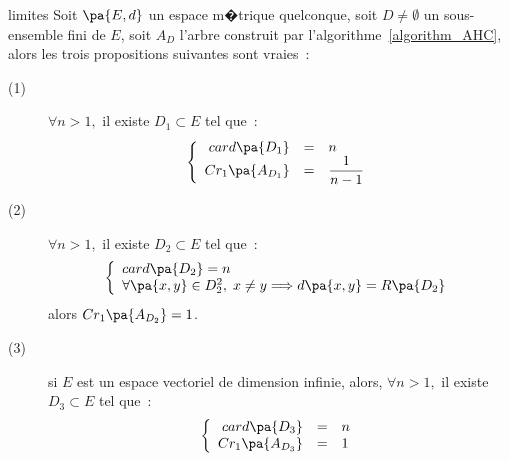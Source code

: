         \begin{xproperty}{limites} \label{property_bornes_atteintes}%
        Soit $\pa{E,d}$ un espace m�trique quelconque, soit $D \neq
        \emptyset$ un sous-ensemble fini de $E$, soit $A_D$ l'arbre construit par
        l'algorithme~\ref{algorithm_AHC}, alors les trois         propositions suivantes sont vraies~:
        
        \begin{description}
        \item[(1) ] $\forall n > 1,$ il existe $D_1 \subset E$ tel que~:
            $$
            \left\{
            \begin{array}{rcl}
            card\pa{D_1} &=& n \\
            Cr_1\pa{A_{D_1}} &=& \dfrac{1}{n-1}
            \end{array}
            \right.
            $$
        \item[(2) ] $\forall n > 1,$ il existe $D_2 \subset E$ tel que~:
            $$
            \left\{
            \begin{array}{l}
            card\pa{D_2} = n \\ %
            \forall \pa{x,y} \in D_2^2, \; x \neq y \Longrightarrow d\pa{x,y} = R\pa{D_2}
            \end{array}
            \right.
            $$
            alors $Cr_1\pa{A_{D_2}} = 1$. \newline
        \item[(3) ] si $E$ est un espace vectoriel de dimension infinie, alors, $\forall n > 1,$ 
                                    il existe $D_3 \subset E$ tel que~:
            $$
            \left\{
            \begin{array}{rcl}
            card\pa{D_3} &=& n \\
            Cr_1\pa{A_{D_3}} &=& 1
            \end{array}
            \right.
            $$
        \end{description}
        \end{xproperty}

